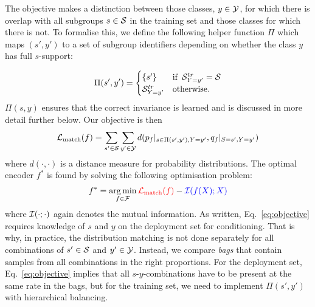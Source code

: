 The objective makes a distinction between those classes, \(y \in {\mathcal{Y}}\), for which there is overlap
with all subgroups \(s \in {\mathcal{S}}\) in the training set and those classes for which there is not.
To formalise this, we define the following helper function $\Pi$ which maps \((s',y')\) to a set of
subgroup identifiers depending on whether the class \(y\) has full \(s\)-support:

\begin{align}\label{eq:Pi}
\Pi(s',y') = \begin{cases}
  \{s'\}&\text{if }\,{\mathcal{S}}^{tr}_{ Y=y' }={\mathcal{S}} \\
  {\mathcal{S}}^{tr}_{ Y=y' }&\text{otherwise.}
\end{cases}
\end{align}
%
$\Pi(s,y)$ ensures that the correct invariance is learned and is discussed in more detail further below.
Our objective is then
%
\begin{align}
  {\mathcal{L}}_\text{match}(f)=\sum\limits_{s'\in{\mathcal{S}}}\sum\limits_{y'\in{\mathcal{Y}}} d(p_f|_{s\in \Pi(s',y'),Y=y'},
  q_f|_{S=s',Y=y'})
\label{eq:objective}
\end{align}
%
where \(d(\cdot, \cdot)\) is a distance measure for probability distributions.
The optimal encoder $f^*$ is found by solving the following optimisation problem:
%
\begin{align}
  f^*=
  \operatorname*{arg\,min}\limits_{f\in{\mathcal{F}}} 
  \textcolor{red}{
  {\mathcal{L}}_\text{match}(f)
  }
  - 
  \textcolor{blue}{
  {\mathcal{I}}(f(X);X)
  }
\end{align}
%
where ${\mathcal{I}}(\cdot; \cdot)$ again denotes the mutual information. As written, Eq.~\ref{eq:objective}
requires knowledge of \(s\) and \(y\) on the deployment set for conditioning. 
%
That is why, in practice, the distribution matching is not done separately for all combinations of
\(s'\in{\mathcal{S}}\) and \(y'\in{\mathcal{Y}}\). 
%
Instead, we compare \emph{bags} that contain samples from all combinations in the right
proportions. For the deployment set, Eq.~\ref{eq:objective} implies that all
\(s\)-\(y\)-combinations have to be present at the same rate in the bags, but for the training set,
we need to implement \(\Pi(s',y')\) with hierarchical balancing.

